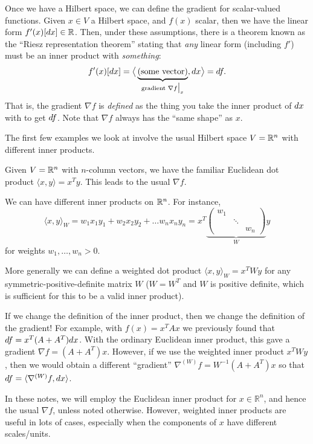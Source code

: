 Once we have a Hilbert space, we can define the gradient for scalar-valued functions. Given $x\in V$ a Hilbert space, and $f(x)$ scalar, then we have the linear form $f'(x) [d x] \in \mathbb R$. Then, under these assumptions, there is a theorem known as the ``Riesz representation theorem'' stating that \emph{any} linear form (including $f'$) must be an inner product with \emph{something}: 
\[
f'(x) [d x] = \big\langle \underbrace{\text{(some vector)}}_{\text{gradient } \nabla f\bigr|_x} , d x \big\rangle = d f.
\]
That is, the gradient $\nabla f$ is \emph{defined} as the thing you take the inner product of $d x$ with to get $d f$.
Note that $\nabla f$ always has the ``same shape'' as $x$.

The first few examples we look at involve the usual Hilbert space $V = \mathbb R^n$ with different inner products.

\begin{example}
    Given $V = \mathbb R^n$ with $n$-column vectors, we have the familiar Euclidean dot product $\langle x, y \rangle = x^T y$. This leads to the usual $\nabla f$.
\end{example}

\begin{example}
    We can have different inner products on $\mathbb R^n$. For instance, 
    \[
    \langle x, y\rangle_W = w_1 x_1 y_1 + w_2 x_2 y_2 + \dots w_n x_n y_n = x^T \underbrace{\begin{pmatrix}
        w_1 & & \\
         & \ddots & \\
         & & w_n
    \end{pmatrix}}_{W} y
    \]
    for weights $w_1,\dots, w_n >0$. 
    
    More generally we can define a weighted dot product $\langle x, y\rangle_W= x^T W y$ for any symmetric-positive-definite matrix $W$ ($W = W^T$ and $W$ is positive definite, which is sufficient for this to be a valid inner product).

    If we change the definition of the inner product, then we change the definition of the gradient!  For example, with $f(x) = x^T A x$ we previously found that $d f = x^T (A + A^T) d x$.  With the ordinary Euclidean inner product, this gave a gradient $\nabla f = (A+A^T)x$.  However, if we use the weighted inner product $x^T W y$, then we would obtain a different ``gradient'' $\nabla^{(W)} f = W^{-1} (A+A^T)x$ so that $d f = \langle \nabla^{(W)}  f , d x \rangle$.
    
    In these notes, we will employ the Euclidean inner product for $x \in \mathbb{R}^n$, and hence the usual $\nabla f$, unless noted otherwise.  However, weighted inner products are useful in lots of cases, especially when the components of $x$ have different scales/units.
\end{example}

